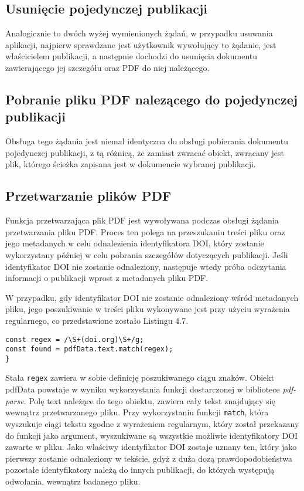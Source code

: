 \documentclass[a4paper,12pt,twoside,openany]{report}
\begin{document}
\subsection{Usunięcie pojedynczej publikacji}
Analogicznie to dwóch wyżej wymienionych żądań, w przypadku usuwania aplikacji, najpierw sprawdzane jest użytkownik wywołujący to żądanie, jest właścicielem publikacji, a następnie dochodzi do usunięcia dokumentu zawierającego jej szczegółu oraz PDF do niej należącego.

\subsection{Pobranie pliku PDF nalezącego do pojedynczej publikacji}
Obsługa tego żądania jest niemal identyczna do obsługi pobierania dokumentu pojedynczej publikacji, z tą różnicą, że zamiast zwracać obiekt, zwracany jest plik, którego ścieżka zapisana jest w dokumencie wybranej publikacji.

\subsection{Przetwarzanie plików PDF}
Funkcja przetwarzająca plik PDF jest wywoływana podczas obsługi żądania przetwarzania pliku PDF. Proces ten polega na przeszukaniu treści pliku oraz jego metadanych w celu odnalezienia identyfikatora DOI, który zostanie wykorzystany później w celu pobrania szczegółów dotyczących publikacji. Jeśli identyfikator DOI nie zostanie odnaleziony, następuje wtedy próba odczytania informacji o publikacji wprost z metadanych pliku PDF.

W przypadku, gdy identyfikator DOI nie zostanie odnaleziony wśród metadanych pliku, jego poszukiwanie w treści pliku wykonywane jest przy użyciu wyrażenia regularnego, co przedstawione zostało Listingu 4.7.

\begin{lstlisting}[caption=Wykorzystanie wyrażenia regularnego do poszukiwania DOI,label=code1,captionpos=b]
const regex = /\S+(doi.org)\S+/g;
const found = pdfData.text.match(regex);
}
\end{lstlisting}
Stała \verb|regex| zawiera w sobie definicję poszukiwanego ciągu znaków. Obiekt pdfData powstaje w wyniku wykorzystania funkcji dostarczonej w bibliotece \textit{pdf-parse}. Polę text należące do tego obiektu, zawiera cały tekst znajdujący się wewnątrz przetwarzanego pliku. Przy wykorzystaniu funkcji \verb|match|, która wyszukuje ciągi tekstu zgodne z wyrażeniem regularnym, który został przekazany do funkcji jako argument, wyszukiwane są wszystkie możliwie identyfikatory DOI zawarte w pliku. Jako właściwy identyfikator DOI zostaje uznany ten, który jako pierwszy zostanie odnaleziony w tekście, gdyż z duża dozą prawdopodobieństwa pozostałe identyfikatory należą do innych publikacji, do których występują odwołania, wewnątrz badanego pliku.
\end{document}
